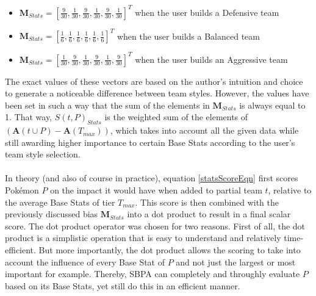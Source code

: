 \documentclass{article}
\begin{document}
\begin{itemize}
	\item $\textbf{M}_{Stats}=[\frac{9}{30},\frac{1}{30},\frac{9}{30},\frac{1}{30},\frac{9}{30},\frac{1}{30}]^T$ when the user builds a Defensive team
	\item $\textbf{M}_{Stats}=[\frac{1}{6},\frac{1}{6},\frac{1}{6},\frac{1}{6},\frac{1}{6},\frac{1}{6}]^T$ when the user builds a Balanced team
	\item $\textbf{M}_{Stats}=[\frac{1}{30},\frac{9}{30},\frac{1}{30},\frac{9}{30},\frac{1}{30},\frac{9}{30}]^T$ when the user builds an Aggressive team
\end{itemize}
The exact values of these vectors are based on the author's intuition and choice to generate a noticeable difference between team styles. However, the values have been set in such a way that the sum of the elements in $\textbf{M}_{Stats}$ is always equal to 1. That way, $S(t,P)_{Stats}$ is the weighted sum of the elements of $(\textbf{A}(t\cup P)-\textbf{A}(T_{max}))$, which takes into account all the given data while still awarding higher importance to certain Base Stats according to the user's team style selection.\\\\
In theory (and also of course in practice), equation \ref{statsScoreEqn} first scores Pok\'emon $P$ on the impact it would have when added to partial team $t$, relative to the average Base Stats of tier $T_{max}$. This score is then combined with the previously discussed bias $\textbf{M}_{Stats}$ into a dot product to result in a final scalar score. The dot product operator was chosen for two reasons. First of all, the dot product is a simplistic operation that is easy to understand and relatively time-efficient. But more importantly, the dot product allows the scoring to take into account the influence of every Base Stat of $P$ and not just the largest or most important for example. Thereby, SBPA can completely and throughly evaluate $P$ based on its Base Stats, yet still do this in an efficient manner.
\end{document}
